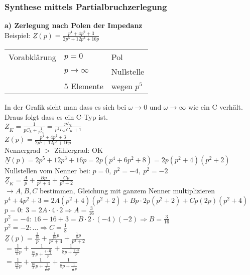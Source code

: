 \subsubsection{Synthese mittels Partialbruchzerlegung}
\textbf{a) Zerlegung nach Polen der Impedanz}\\
Beispiel: $\underline{Z}(p) = \frac{p^4+4p^2+3}{2p^5+12p^3+16p}$\\
\begin{tabular}{lll}
	Vorabklärung & $p=0$ & Pol \\
	& $p \rightarrow \infty$ & Nullstelle \\
	& 5 Elemente & wegen $p^5$ \\
\end{tabular}
In der Grafik sieht man dass es sich bei $\omega \rightarrow 0$ und $\omega
\rightarrow \infty$ wie ein C verhält. Draus folgt dass es ein C-Typ ist.\\
$\underline{Z}_K=\frac{1}{pC_k+\frac{1}{pL_k}} = \frac{pL_k}{p^2L_KC_K+1}$\\
$\underline{Z}(p)=\frac{p^4+4p^2+3}{2p^5+12p^3+16p}$\\
Nennergrad $>$ Zählergrad: OK\\
$\underline{N}(p)=2p^5+12p^3+16p=2p(p^4+6p^2+8)=2p(p^2+4)(p^2+2)$\\
Nullstellen vom Nenner bei: $p=0,\ p^2=-4,\ p^2=-2$\\
$\underline{Z}_K=\frac{A}{p}+\frac{Bp}{p^2+4}+\frac{Cp}{p^2+2}$\\
$\rightarrow A,B,C$ bestimmen, Gleichung mit ganzem Nenner multiplizieren\\
$p^4+4p^2+3=2A(p^2+4)(p^2+2)+Bp\cdot 2p(p^2+2)+Cp(2p)(p^2+4)$\\
$p=0:\ 3=2A\cdot 4 \cdot 2 \Rightarrow A = \frac{3}{16}$\\
$p^2=-4:\ 16-16+3=B\cdot 2\cdot (-4)(-2) \Rightarrow B=\frac{3}{16}$\\
$p^2=-2: \ldots \Rightarrow C=\frac{1}{8}$\\
$\underline{Z}(p)=\frac{\frac{3}{16}}{p}+\frac{\frac{3}{16}p}{p^2+4}+\frac{\frac{1}{8}p}{p^2+2}$\\
$=\frac{1}{\frac{16}{3}p}+\frac{1}{\frac{16}{3}p+\frac{4\cdot\frac{16}{3}}{p}}+\frac{1}{8p+\frac{2\cdot8}{p}}$\\
$=\frac{1}{\frac{16}{3}p}+\frac{1}{\frac{16}{3}p+\frac{1}{\frac{3}{64}p}}+\frac{1}{8p+\frac{1}{\frac{1}{16}p}}$\\

